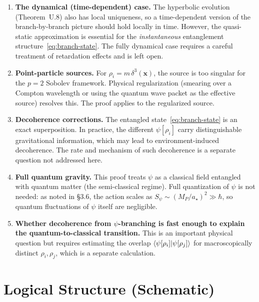 \documentclass[aps,prd,twocolumn,superscriptaddress,nofootinbib]{revtex4-2}
\newcommand{\astar}{a_\star}
\begin{document}
\begin{enumerate}
\item \textbf{The dynamical (time-dependent) case.} The hyperbolic
evolution (Theorem~U.8) also has local uniqueness, so a time-dependent
version of the branch-by-branch picture should hold locally in time.
However, the quasi-static approximation is essential for the
\emph{instantaneous} entanglement structure~\eqref{eq:branch-state}.
The fully dynamical case requires a careful treatment of retardation
effects and is left open.

\item \textbf{Point-particle sources.} For $\rho_i = m\,\delta^3(\mathbf{x})$,
the source is too singular for the $p = 2$ Sobolev framework. Physical
regularization (smearing over a Compton wavelength or using the quantum
wave packet as the effective source) resolves this. The proof applies to
the regularized source.

\item \textbf{Decoherence corrections.} The entangled state~\eqref{eq:branch-state}
is an exact superposition. In practice, the different $\psi[\rho_i]$
carry distinguishable gravitational information, which may lead to
environment-induced decoherence. The rate and mechanism of such
decoherence is a separate question not addressed here.

\item \textbf{Full quantum gravity.} This proof treats $\psi$ as a
classical field entangled with quantum matter (the semi-classical regime).
Full quantization of $\psi$ is not needed: as noted in \cite{DFDUnified}
\S3.6, the action scales as $S_\psi \sim (M_P/\astar)^2 \gg \hbar$,
so quantum fluctuations of $\psi$ itself are negligible.

\item \textbf{Whether decoherence from $\psi$-branching is fast enough
to explain the quantum-to-classical transition.} This is an important
physical question but requires estimating the overlap
$\braket{\psi[\rho_i]|\psi[\rho_j]}$ for macroscopically distinct
$\rho_i, \rho_j$, which is a separate calculation.
\end{enumerate}

\section{Logical Structure (Schematic)}
\end{document}
